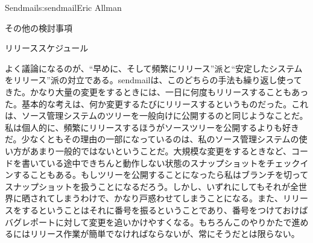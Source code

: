 \begin{aosachapter}{Sendmail}{s:sendmail}{Eric Allman}
\begin{aosasect1}{その他の検討事項}
\begin{aosasect2}{リリーススケジュール}

よく議論になるのが、``早めに、そして頻繁にリリース''派と``安定したシステムをリリース''派の対立である。sendmailは、このどちらの手法も繰り返し使ってきた。かなり大量の変更をするときには、一日に何度もリリースすることもあった。基本的な考えは、何か変更するたびにリリースするというものだった。これは、ソース管理システムのツリーを一般向けに公開するのと同じようなことだ。私は個人的に、頻繁にリリースするほうがソースツリーを公開するよりも好きだ。少なくともその理由の一部になっているのは、私のソース管理システムの使い方があまり一般的ではないということだ。大規模な変更をするときなど、コードを書いている途中できちんと動作しない状態のスナップショットをチェックインすることもある。もしツリーを公開することになったら私はブランチを切ってスナップショットを扱うことになるだろう。しかし、いずれにしてもそれが全世界に晒されてしまうわけで、かなり戸惑わせてしまうことになる。また、リリースをするということはそれに番号を振るということであり、番号をつけておけばバグレポートに対して変更を追いかけやすくなる。もちろんこのやりかたで進めるにはリリース作業が簡単でなければならないが、常にそうだとは限らない。


\end{aosasect2}
\end{aosasect1}
\end{aosachapter}

